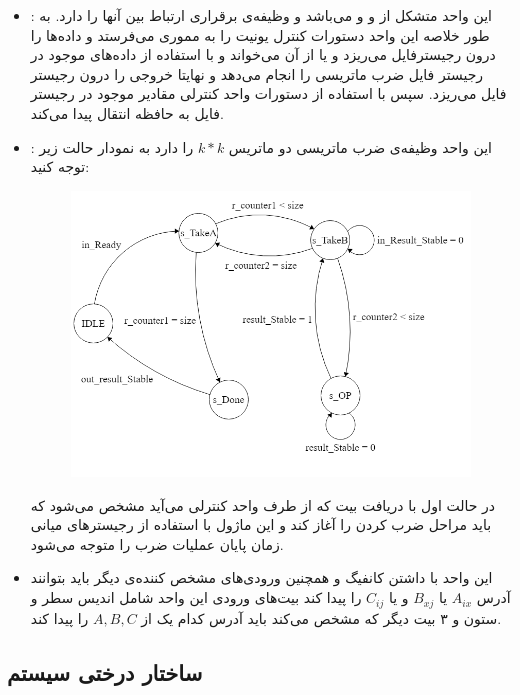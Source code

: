 \documentclass[12pt,onecolumn,a4paper,fleqn]{article}
\begin{document}
\begin{itemize}
	\item 
	:
	این واحد متشکل از  و  و  می‌باشد و وظیفه‌ی برقراری ارتباط بین آنها را دارد. به طور خلاصه این واحد دستورات کنترل یونیت را به مموری می‌فرستد و داده‌ها را درون رجیسترفایل می‌ریزد و یا از آن می‌خواند و  با استفاده از داده‌های موجود در رجیستر فایل ضرب ماتریسی را انجام می‌دهد و نهایتا خروجی را درون رجیستر فایل می‌ریزد. سپس با استفاده از دستورات واحد کنترلی مقادیر موجود در رجیستر فایل به حافظه انتقال پیدا می‌کند.
	\item 
	:
	این واحد وظیفه‌ی ضرب ماتریسی دو ماتریس $k*k$ را دارد به نمودار حالت زیر توجه کنید:
	\begin{figure}[h]
		\centering
		\includegraphics[width=0.5\linewidth]{source/square_matrix.png}
		\caption{}
	\end{figure}
	در حالت اول با دریافت بیت  که از طرف واحد کنترلی می‌آید مشخص می‌شود که باید مراحل ضرب کردن را آغاز کند و این ماژول با استفاده از رجیستر‌های میانی زمان پایان عملیات ضرب را متوجه می‌شود.
	\item 
	این واحد با داشتن کانفیگ و همچنین ورودی‌های مشخص کننده‌ی دیگر باید بتوانند آدرس $A_{ix}$ یا $B_{xj}$ و یا $C_{ij}$ را پیدا کند بیت‌های ورودی این واحد شامل اندیس سطر و ستون و ۳ بیت دیگر که مشخص می‌کند باید آدرس کدام یک از $A,B,C$ را پیدا کند.
\end{itemize}

\pagebreak
\subsection{ساختار درختی سیستم}
\end{document}
